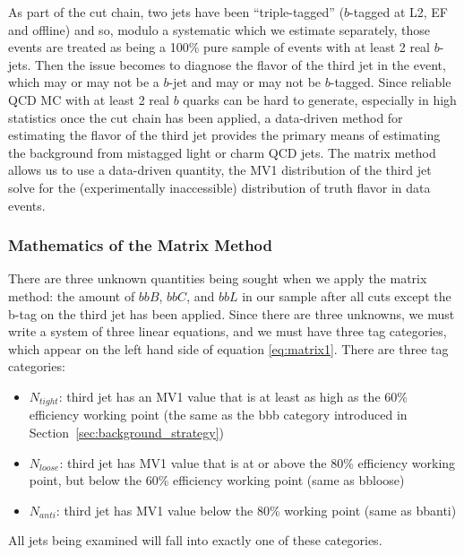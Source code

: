 As part of the cut chain, two jets have been ``triple-tagged'' ($b$-tagged
at L2, EF and offline) and so, modulo a systematic which we estimate separately, 
those events are treated as being a 100\% pure sample of events with at least 2 real $b$-jets.
Then the issue becomes to diagnose the flavor of the third jet in the event,
which may or may not be a $b$-jet and may or may not be $b$-tagged.  Since
reliable QCD MC with at least 2 real $b$ quarks can be hard to generate, especially
in high statistics once the cut chain has been applied, a data-driven method for
estimating the flavor of the third jet provides the primary means of estimating
the background from mistagged light or charm QCD jets.  The matrix method allows
us to use a data-driven quantity, the MV1 distribution of the third jet
solve for the (experimentally inaccessible) distribution of truth flavor in data events.

\subsubsection{Mathematics of the Matrix Method}
There are three unknown quantities being sought when we apply the matrix method: the amount of $bbB$, $bbC$, and $bbL$ in our sample after all cuts except the b-tag on the third jet has been applied.   Since there are three unknowns, we must write a system of three linear equations, and we must have three tag categories, which appear on the left hand side of equation \ref{eq:matrix1}.  There are three tag categories:
	
	\begin{itemize}
		\item $N_{tight}$: third jet has an MV1 value that is at least as high as the 60\% efficiency working point (the same as the bbb category introduced in Section~\ref{sec:background_strategy})
		\item $N_{loose}$: third jet has MV1 value that is at or above the 80\% efficiency working point, but below the 60\% efficiency working point (same as bbloose)
		\item $N_{anti}$: third jet has MV1 value below the 80\% working point (same as bbanti)
	\end{itemize}

All jets being examined will fall into exactly one of these categories.

